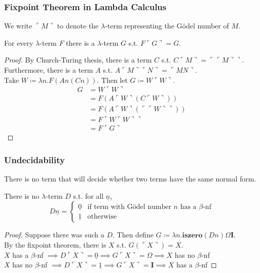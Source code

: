 \documentclass[UTF8,aspectratio=43,11pt,colorlinks,compress,openany]{beamer}%
\begin{document}
\begin{frame}\frametitle{Fixpoint Theorem in Lambda Calculus}
	We write $\ulcorner M\urcorner$ to denote the $\lambda$-term representing the G\"odel number of $M$.
	\begin{theorem}
		For every $\lambda$-term $F$ there is a $\lambda$-term $G$ s.t. $F\ulcorner G\urcorner=G$.
	\end{theorem}
	\begin{proof}
		By Church-Turing thesis, there is a term $C$ s.t. $C\ulcorner M\urcorner=\ulcorner\ulcorner M\urcorner\urcorner$.\\
		Furthermore, there is a term $A$ s.t. $A\ulcorner M\urcorner\ulcorner N\urcorner=\ulcorner MN\urcorner$.\\
		Take $W\coloneqq \lambda n.F(An(Cn))$. Then let $G\coloneqq W\ulcorner W\urcorner$.
	\setlength\belowdisplayskip{0pt}
		\begin{align*}
		G&=W\ulcorner W\urcorner\\
		&=F(A\ulcorner W\urcorner(C\ulcorner W\urcorner))\\
		&=F(A\ulcorner W\urcorner(\ulcorner\ulcorner W\urcorner\urcorner))\\
		&=F\ulcorner W\ulcorner W\urcorner\urcorner\\
		&=F\ulcorner G\urcorner
		\end{align*}
	\end{proof}
\end{frame}

\begin{frame}\frametitle{Undecidability}
	\begin{theorem}[Church1936]
		There is no term that will decide whether two terms have the same normal form.
	\end{theorem}
	\begin{theorem}[Church1936]
		There is no $\lambda$-term $D$ s.t. for all $\underline{n}$,
		\[D\underline{n}=
		\begin{cases}
		\underline{0}&\text{if term with G\"odel number $n$ has a $\beta$-nf}\\
		\underline{1}&\text{otherwise}
		\end{cases}\]
	\end{theorem}
	\begin{proof}
		Suppose there was such a $D$. Then define $G\coloneqq \lambda n.\mathbf{iszero}(Dn)\Omega\mathbf{I}$.\\
		By the fixpoint theorem, there is $X$ s.t. $G(\ulcorner X\urcorner)=X$.\\
		$X$ has a $\beta$-nf $\implies D\ulcorner X\urcorner=\underline{0}\implies G\ulcorner X\urcorner=\Omega\implies X$ has no $\beta$-nf\\
		$X$ has no $\beta$-nf $\implies D\ulcorner X\urcorner=\underline{1}\implies G\ulcorner X\urcorner=\mathbf{I}\implies X$ has a $\beta$-nf
	\end{proof}
\end{frame}
\end{document}
